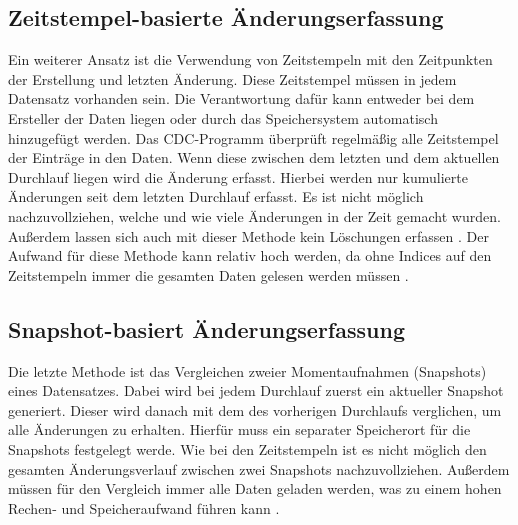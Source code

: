 \subsection{Zeitstempel-basierte Änderungserfassung}
Ein weiterer Ansatz ist die Verwendung von Zeitstempeln mit den Zeitpunkten der Erstellung und letzten Änderung.
Diese Zeitstempel müssen in jedem Datensatz vorhanden sein.
Die Verantwortung dafür kann entweder bei dem Ersteller der Daten liegen oder durch das Speichersystem automatisch hinzugefügt werden.
Das CDC-Programm überprüft regelmäßig alle Zeitstempel der Einträge in den Daten.
Wenn diese zwischen dem letzten und dem aktuellen Durchlauf liegen wird die Änderung erfasst.
Hierbei werden nur kumulierte Änderungen seit dem letzten Durchlauf erfasst.
Es ist nicht möglich nachzuvollziehen, welche und wie viele Änderungen in der Zeit gemacht wurden.
Außerdem lassen sich auch mit dieser Methode kein Löschungen erfassen \parencite{delta-view_gen}.
Der Aufwand für diese Methode kann relativ hoch werden, da ohne Indices auf den Zeitstempeln immer die gesamten Daten gelesen werden müssen \parencite{boeing}.

\subsection{Snapshot-basiert Änderungserfassung}
\label{sec:snaps}
Die letzte Methode ist das Vergleichen zweier Momentaufnahmen (Snapshots) eines Datensatzes.
Dabei wird bei jedem Durchlauf zuerst ein aktueller Snapshot generiert.
Dieser wird danach mit dem des vorherigen Durchlaufs verglichen, um alle Änderungen zu erhalten.
Hierfür muss ein separater Speicherort für die Snapshots festgelegt werde.
Wie bei den Zeitstempeln ist es nicht möglich den gesamten Änderungsverlauf zwischen zwei Snapshots nachzuvollziehen.
Außerdem müssen für den Vergleich immer alle Daten geladen werden, was zu einem hohen Rechen- und Speicheraufwand führen kann \parencite{cdc_in_nosql}.